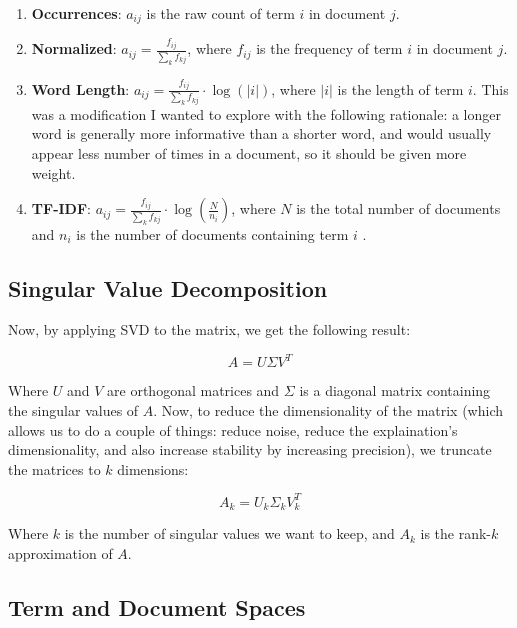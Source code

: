 \documentclass[a4paper, 12pt]{article}
\begin{document}
\begin{enumerate}
    \item \textbf{Occurrences}: $a_{ij}$ is the raw count of term $i$ in document $j$.
    
    \vspace{0.25cm}
    \item \textbf{Normalized}: $a_{ij} = \frac{f_{ij}}{\sum_k f_{kj}}$, where $f_{ij}$ is the frequency of term $i$ in document $j$.

    \vspace{0.25cm}
    \item \textbf{Word Length}: $a_{ij} = \frac{f_{ij}}{\sum_k f_{kj}} \cdot \log(|i|)$, where $|i|$ is the length of term $i$. This was a modification I wanted to explore with the following rationale: a longer word is generally more informative than a shorter word, and would usually appear less number of times in a document, so it should be given more weight.

    \vspace{0.25cm}
    \item \textbf{TF-IDF}: $a_{ij} = \frac{f_{ij}}{\sum_k f_{kj}} \cdot \log(\frac{N}{n_i})$, where $N$ is the total number of documents and $n_i$ is the number of documents containing term $i$ \cite{wikipedia_tfidf}.
\end{enumerate}

\subsection*{Singular Value Decomposition}

Now, by applying SVD to the matrix, we get the following result:

\[ A = U\Sigma V^T \]

Where $U$ and $V$ are orthogonal matrices and $\Sigma$ is a diagonal matrix containing the singular values of $A$. Now, to reduce the dimensionality of the matrix (which allows us to do a couple of things: reduce noise, reduce the explaination's dimensionality, and also increase stability by increasing precision), we truncate the matrices to $k$ dimensions:

\[ A_k = U_k\Sigma_k V_k^T \]

Where $k$ is the number of singular values we want to keep, and $A_k$ is the rank-$k$ approximation of $A$.

\subsection*{Term and Document Spaces}
\end{document}
